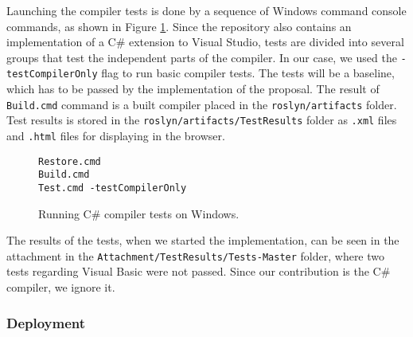 Launching the compiler tests is done by a sequence of Windows command console commands, as shown in Figure \ref{img65:runTests}. 
Since the repository also contains an implementation of a C\# extension to Visual Studio, tests are divided into several groups that test the independent parts of the compiler. 
In our case, we used the \texttt{-testCompilerOnly} flag to run basic compiler tests. 
The tests will be a baseline, which has to be passed by the implementation of the proposal. 
The result of \texttt{Build.cmd} command is a built compiler placed in the \texttt{roslyn/artifacts} folder. 
Test results is stored in the \texttt{roslyn/artifacts/TestResults} folder as \texttt{.xml} files and \texttt{.html} files for displaying in the browser.
\begin{figure}[h]
\begin{lstlisting}
Restore.cmd
Build.cmd
Test.cmd -testCompilerOnly
\end{lstlisting}
\caption{Running C\# compiler tests on Windows.}
\label{img65:runTests}
\end{figure}
\par
The results of the tests, when we started the implementation, can be seen in the attachment in the \texttt{Attachment/TestResults/Tests-Master} folder, where two tests regarding Visual Basic were not passed. 
Since our contribution is the C\# compiler, we ignore it.

\subsubsection{Deployment}

